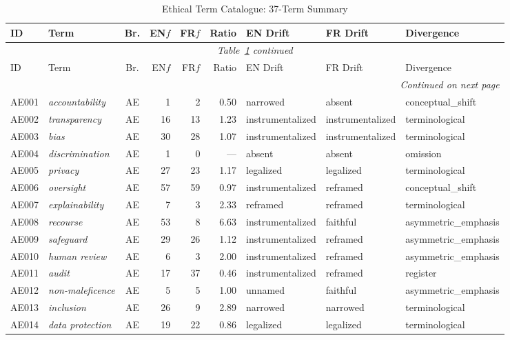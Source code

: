 \begin{longtable}{llcrrrllp{2.2cm}}
\caption{Ethical Term Catalogue: 37-Term Summary}\label{tab:catalogue} \\
\toprule
ID & Term & Br. & EN$f$ & FR$f$ & Ratio & EN Drift & FR Drift & Divergence \\
\midrule
\endfirsthead
\multicolumn{9}{c}{\textit{Table~\ref{tab:catalogue} continued}} \\
\toprule
ID & Term & Br. & EN$f$ & FR$f$ & Ratio & EN Drift & FR Drift & Divergence \\
\midrule
\endhead
\midrule \multicolumn{9}{r}{\textit{Continued on next page}} \\
\endfoot
\bottomrule
\endlastfoot
  AE001 & \textit{accountability} & AE & 1 & 2 & 0.50 & narrowed & absent & conceptual\_shift \\
  AE002 & \textit{transparency} & AE & 16 & 13 & 1.23 & instrumentalized & instrumentalized & terminological \\
  AE003 & \textit{bias} & AE & 30 & 28 & 1.07 & instrumentalized & instrumentalized & terminological \\
  AE004 & \textit{discrimination} & AE & 1 & 0 & --- & absent & absent & omission \\
  AE005 & \textit{privacy} & AE & 27 & 23 & 1.17 & legalized & legalized & terminological \\
  AE006 & \textit{oversight} & AE & 57 & 59 & 0.97 & instrumentalized & reframed & conceptual\_shift \\
  AE007 & \textit{explainability} & AE & 7 & 3 & 2.33 & reframed & reframed & terminological \\
  AE008 & \textit{recourse} & AE & 53 & 8 & 6.63 & instrumentalized & faithful & asymmetric\_emphasis \\
  AE009 & \textit{safeguard} & AE & 29 & 26 & 1.12 & instrumentalized & reframed & asymmetric\_emphasis \\
  AE010 & \textit{human review} & AE & 6 & 3 & 2.00 & instrumentalized & reframed & asymmetric\_emphasis \\
  AE011 & \textit{audit} & AE & 17 & 37 & 0.46 & instrumentalized & reframed & register \\
  AE012 & \textit{non-maleficence} & AE & 5 & 5 & 1.00 & unnamed & faithful & asymmetric\_emphasis \\
  AE013 & \textit{inclusion} & AE & 26 & 9 & 2.89 & narrowed & narrowed & terminological \\
  AE014 & \textit{data protection} & AE & 19 & 22 & 0.86 & legalized & legalized & terminological \\

\end{longtable}
